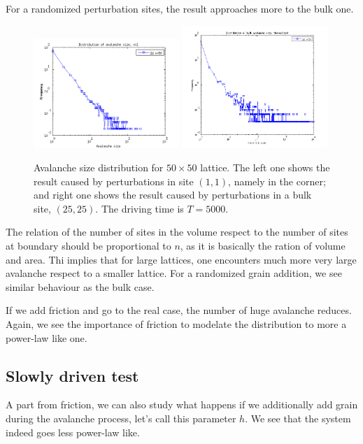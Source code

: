 For a randomized perturbation sites, the result approaches more to the bulk one. 
\begin{figure} 
\begin{center}
\includegraphics[width=0.49\textwidth]{results/sv1.png}
\includegraphics[width=0.49\textwidth]{results/sbulk_th.png} 
\caption{Avalanche size distribution for $50\times50$ lattice. 
The left one shows the result caused by perturbations in site $(1,1)$, namely in the corner; 
and right one shows the result caused by perturbations in a bulk site, $(25,25)$. The driving time is $T=5000$.  }
\label{sv}
\end{center}
\end{figure} 


The relation of the number of sites in the volume respect to the number of sites at boundary should be proportional to $n$, as it is basically the ration of volume and area.
Thi implies that for large lattices, one encounters much more very large avalanche respect to a smaller lattice. For a randomized grain addition, we see similar behaviour as the bulk case.

If we add friction and go to the real case, the number of huge avalanche reduces. Again, we see the importance of friction to modelate the distribution to more a power-law like one.



\subsection{Slowly driven test}
A part from friction, we can also study what happens if we additionally add grain during the avalanche process, let's call this parameter $h$.
We see that the system indeed goes less power-law like.

